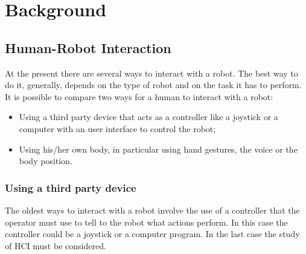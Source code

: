 \documentclass[../thesis.tex]{subfiles}
\begin{document}
\chapter{Background}\label{cap:background}

\section{Human-Robot Interaction}
At the present there are several ways to interact with a robot. The best way to do it, generally, depends on the type of robot and on the task it has to perform. It is possible to compare two ways for a human to interact with a robot:
\begin{itemize}
    \item Using a third party device that acts as a controller like a joystick or a computer with an user interface to control the robot;
    \item Using his/her own body, in particular using hand gestures, the voice or the body position.
\end{itemize}
\subsection{Using a third party device}
The oldest ways to interact with a robot involve the use of a controller that the operator must use to tell to the robot what actions perform. In this case the controller could be a joystick or a computer program. In the last case the study of \acrfull{HCI} must be considered.
\end{document}
